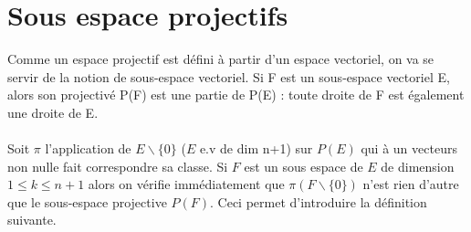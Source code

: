 \documentclass[12pt]{report}
\begin{document}
\section{Sous espace projectifs} 

Comme un espace projectif est défini à partir d'un espace vectoriel, 
on va se servir de la notion de sous-espace vectoriel. Si F est un 
sous-espace vectoriel E, alors son projectivé P(F) est une partie 
de P(E) : toute droite de F est également une droite de E. \\
\\
Soit $\pi$ l'application de $E\backslash\{0\}$ ($E$ e.v de dim n+1) sur $P(E)$ qui à un vecteurs non nulle fait correspondre sa classe. Si $F$ est un sous espace de $E$ de dimension $1\leqslant k \leqslant n+1 $   alors on vérifie immédiatement que $\pi(F\backslash\{0\})$ n'est rien d'autre que le sous-espace projective $P(F)$. Ceci 
permet d'introduire la définition suivante.\\ 
\end{document}
